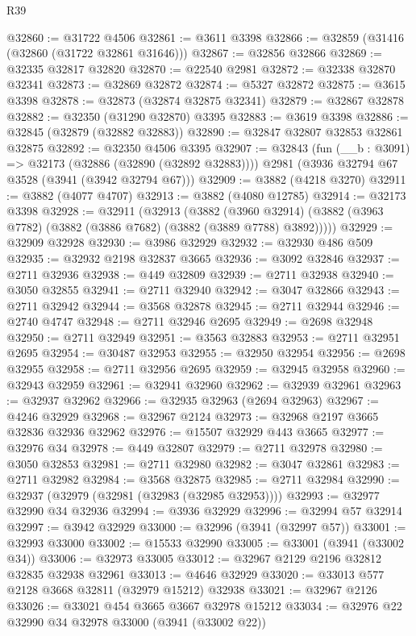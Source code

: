 \begin{lexlean}{R39}
\begin{coremodule}
@32860 := @31722 @4506
@32861 := @3611 @3398
@32866 := @32859 (@31416 (@32860 (@31722 @32861 @31646)))
@32867 := @32856 @32866
@32869 := @32335 @32817 @32820
@32870 := @22540 @2981
@32872 := @32338 @32870 @32341
@32873 := @32869 @32872
@32874 := @5327 @32872
@32875 := @3615 @3398
@32878 := @32873 (@32874 @32875 @32341)
@32879 := @32867 @32878
@32882 := @32350 (@31290 @32870) @3395
@32883 := @3619 @3398
@32886 := @32845 (@32879 (@32882 @32883))
@32890 := @32847 @32807 @32853 @32861 @32875
@32892 := @32350 @4506 @3395
@32907 := @32843
    (fun (__b : @3091) => @32173 (@32886 (@32890 (@32892 @32883))))
    @2981
    (@3936 @32794 @67 @3528 (@3941 (@3942 @32794 @67)))
@32909 := @3882 (@4218 @3270)
@32911 := @3882 (@4077 @4707)
@32913 := @3882 (@4080 @12785)
@32914 := @32173 @3398
@32928 := @32911
    (@32913
      (@3882
        (@3960 @32914)
        (@3882 (@3963 @7782) (@3882 (@3886 @7682) (@3882 (@3889 @7788) @3892)))))
@32929 := @32909 @32928
@32930 := @3986 @32929
@32932 := @32930 @486 @509
@32935 := @32932 @2198 @32837 @3665
@32936 := @3092 @32846
@32937 := @2711 @32936
@32938 := @449 @32809
@32939 := @2711 @32938
@32940 := @3050 @32855
@32941 := @2711 @32940
@32942 := @3047 @32866
@32943 := @2711 @32942
@32944 := @3568 @32878
@32945 := @2711 @32944
@32946 := @2740 @4747
@32948 := @2711 @32946 @2695
@32949 := @2698 @32948
@32950 := @2711 @32949
@32951 := @3563 @32883
@32953 := @2711 @32951 @2695
@32954 := @30487 @32953
@32955 := @32950 @32954
@32956 := @2698 @32955
@32958 := @2711 @32956 @2695
@32959 := @32945 @32958
@32960 := @32943 @32959
@32961 := @32941 @32960
@32962 := @32939 @32961
@32963 := @32937 @32962
@32966 := @32935 @32963 (@2694 @32963)
@32967 := @4246 @32929
@32968 := @32967 @2124
@32973 := @32968 @2197 @3665 @32836 @32936 @32962
@32976 := @15507 @32929 @443 @3665
@32977 := @32976 @34
@32978 := @449 @32807
@32979 := @2711 @32978
@32980 := @3050 @32853
@32981 := @2711 @32980
@32982 := @3047 @32861
@32983 := @2711 @32982
@32984 := @3568 @32875
@32985 := @2711 @32984
@32990 := @32937 (@32979 (@32981 (@32983 (@32985 @32953))))
@32993 := @32977 @32990 @34 @32936
@32994 := @3936 @32929
@32996 := @32994 @57 @32914
@32997 := @3942 @32929
@33000 := @32996 (@3941 (@32997 @57))
@33001 := @32993 @33000
@33002 := @15533 @32990
@33005 := @33001 (@3941 (@33002 @34))
@33006 := @32973 @33005
@33012 := @32967 @2129 @2196 @32812 @32835 @32938 @32961
@33013 := @4646 @32929
@33020 := @33013 @577 @2128 @3668 @32811 (@32979 @15212) @32938
@33021 := @32967 @2126
@33026 := @33021 @454 @3665 @3667 @32978 @15212
@33034 := @32976 @22 @32990 @34 @32978 @33000 (@3941 (@33002 @22))

\end{coremodule}
\end{lexlean}
